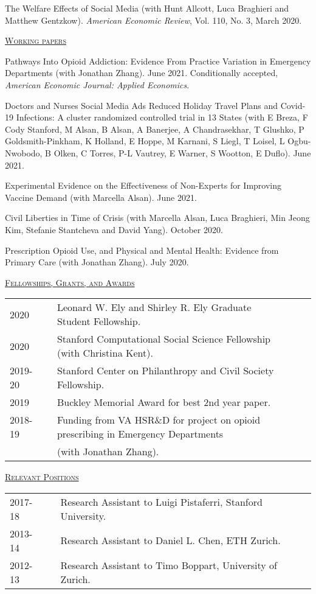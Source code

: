 \documentclass[letterpaper,11pt]{article}
\begin{document}
The Welfare Effects of Social Media (with Hunt Allcott, Luca Braghieri and Matthew Gentzkow). \textit{American Economic Review}, Vol. 110, No. 3, March 2020.

\bigskip

\underline {\textsc{Working papers}}

Pathways Into Opioid Addiction: Evidence From Practice Variation in Emergency Departments (with Jonathan Zhang). June 2021. Conditionally accepted, \textit{American Economic Journal: Applied Economics}.

Doctors and Nurses Social Media Ads Reduced Holiday Travel Plans and Covid-19 Infections: A cluster randomized controlled trial in 13 States (with E Breza, F Cody Stanford, M Alsan, B Alsan, A Banerjee, A Chandrasekhar, T Glushko, P Goldsmith-Pinkham, K Holland, E Hoppe, M Karnani, S Liegl, T Loisel, L Ogbu-Nwobodo, B Olken, C Torres, P-L Vautrey, E Warner, S Wootton, E Duflo). June 2021.

Experimental Evidence on the Effectiveness of Non-Experts for Improving Vaccine Demand (with Marcella Alsan). June 2021.

Civil Liberties in Time of Crisis (with Marcella Alsan, Luca Braghieri, Min Jeong Kim, Stefanie Stantcheva and David Yang). October 2020.

Prescription Opioid Use, and Physical and Mental Health: Evidence from Primary Care (with Jonathan Zhang). July 2020.

 
 \bigskip

\newpage

\underline {\textsc{Fellowships, Grants, and Awards}}

\begin{tabular}{@{}l@{}cl@{}cl}
2020 & & Leonard W. Ely and Shirley R. Ely Graduate Student Fellowship. \\
2020 & & Stanford Computational Social Science Fellowship (with Christina Kent). \\
2019-20 & & Stanford Center on Philanthropy and Civil Society Fellowship. \\
2019 & & Buckley Memorial Award for best 2nd year paper. \\
2018-19 & & Funding from VA HSR\&D for project on opioid prescribing in Emergency Departments \\ & & (with Jonathan Zhang).
\end{tabular}
 \bigskip
 
\underline {\textsc{Relevant Positions}}

\begin{tabular}{@{}l@{}cl@{}cl}
2017-18 & & Research Assistant to Luigi Pistaferri, Stanford University. \\
2013-14 & & Research Assistant to Daniel L. Chen, ETH Zurich. \\
2012-13 & & Research Assistant to Timo Boppart, University of Zurich.
\end{tabular}
\end{document}

